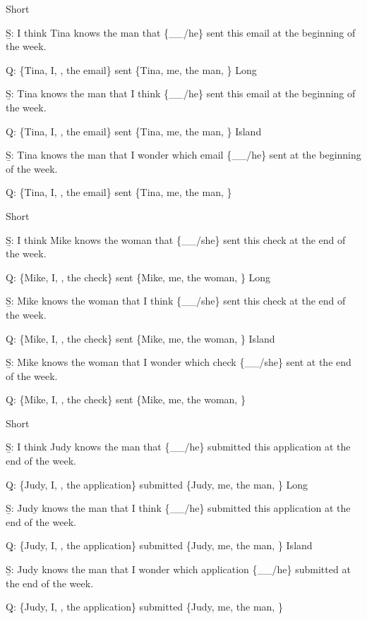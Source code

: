 \pex 
\a Short\par\nobreak
\beginsubsub 
\b{S:} I think Tina knows the man that \{\_\_/he\} sent this email at the beginning of the week.\par\nobreak
\b{Q:} \{Tina, I, , the email\} sent \{Tina, me, the man, \}
\endsubsub
\a Long\par\nobreak
\beginsubsub
\b{S:} Tina knows the man that I think \{\_\_/he\} sent this email at the beginning of the week.\par\nobreak
\b{Q:} \{Tina, I, , the email\} sent \{Tina, me, the man, \}
\endsubsub
\a Island\par\nobreak
\beginsubsub
\b{S:} Tina knows the man that I wonder which email \{\_\_/he\} sent at the beginning of the week.\par\nobreak
\b{Q:} \{Tina, I, , the email\} sent \{Tina, me, the man, \}
\endsubsub
\xe

\pex 
\a Short\par\nobreak
\beginsubsub 
\b{S:} I think Mike knows the woman that \{\_\_/she\} sent this check at the end of the week.\par\nobreak
\b{Q:} \{Mike, I, , the check\} sent \{Mike, me, the woman, \}
\endsubsub
\a Long\par\nobreak
\beginsubsub
\b{S:} Mike knows the woman that I think \{\_\_/she\} sent this check at the end of the week.\par\nobreak
\b{Q:} \{Mike, I, , the check\} sent \{Mike, me, the woman, \}
\endsubsub
\a Island\par\nobreak
\beginsubsub
\b{S:} Mike knows the woman that I wonder which check \{\_\_/she\} sent at the end of the week.\par\nobreak
\b{Q:} \{Mike, I, , the check\} sent \{Mike, me, the woman, \}
\endsubsub
\xe

\pex 
\a Short\par\nobreak
\beginsubsub 
\b{S:} I think Judy knows the man that \{\_\_/he\} submitted this application at the end of the week.\par\nobreak
\b{Q:} \{Judy, I, , the application\} submitted \{Judy, me, the man, \}
\endsubsub
\a Long\par\nobreak
\beginsubsub
\b{S:} Judy knows the man that I think \{\_\_/he\} submitted this application at the end of the week.\par\nobreak
\b{Q:} \{Judy, I, , the application\} submitted \{Judy, me, the man, \}
\endsubsub
\a Island\par\nobreak
\beginsubsub
\b{S:} Judy knows the man that I wonder which application \{\_\_/he\} submitted at the end of the week.\par\nobreak
\b{Q:} \{Judy, I, , the application\} submitted \{Judy, me, the man, \}
\endsubsub
\xe

